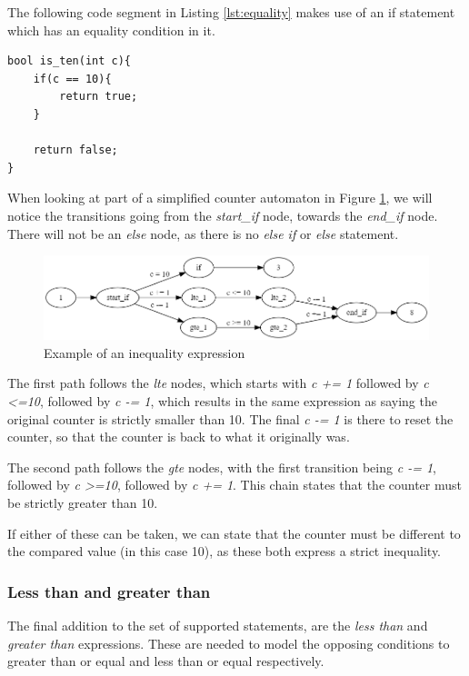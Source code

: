 \documentclass[12pt]{article}
\begin{document}
The following code segment in Listing \ref{lst:equality} makes use of an if statement which has an equality condition in it.

\begin{lstlisting}[style=CStyle, caption={Example of C code containing an equality condition}, label={lst:equality}]
bool is_ten(int c){
	if(c == 10){
		return true;
	}

	return false;
}
\end{lstlisting}

When looking at part of a simplified counter automaton in Figure \ref{fig:inequality_expression}, we will notice the transitions going from the \textit{start\_if} node, towards the \textit{end\_if} node. There will not be an \textit{else} node, as there is no \textit{else if} or \textit{else} statement.

\begin{figure}[h]
	\centering
	\includegraphics[width=\linewidth]{inequality_expression}
	\caption{Example of an inequality expression}
	\label{fig:inequality_expression}
\end{figure}

The first path follows the \textit{lte} nodes, which starts with \textit{c += 1} followed by \textit{c \textless =10}, followed by \textit{c -= 1}, which results in the same expression as saying the original counter is strictly smaller than 10. The final \textit{c -= 1} is there to reset the counter, so that the counter is back to what it originally was. 

The second path follows the \textit{gte} nodes, with the first transition being \textit{c -= 1}, followed by \textit{c \textgreater =10}, followed by \textit{c += 1}. This chain states that the counter must be strictly greater than 10.

If either of these can be taken, we can state that the counter must be different to the compared value (in this case 10), as these both express a strict inequality. 

\subsubsection{Less than and greater than}
\label{sec:strict}
The final addition to the set of supported statements, are the \textit{less than} and \textit{greater than} expressions. These are needed to model the opposing conditions to greater than or equal and less than or equal respectively.
\end{document}
